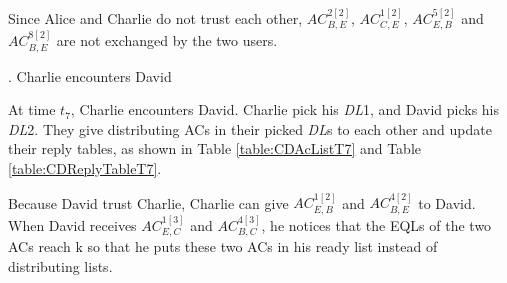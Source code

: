 Since Alice and Charlie do not trust each other, ${AC}^{2\left[2\right]}_{B,E}$, ${AC}^{1\left[2\right]}_{C,E}$, ${AC}^{5\left[2\right]}_{E,B}$ and ${AC}^{8\left[2\right]}_{B,E}$ are not exchanged by the two users.

.  Charlie encounters David

At time ${t}_{7}$, Charlie encounters David. Charlie pick his \textit{DL}1, and David picks his \textit{DL}2. They give distributing ACs in their picked \textit{DL}s to each other and update their reply tables, as shown in Table \ref{table:CDAcListT7} and Table \ref{table:CDReplyTableT7}.

Because David trust Charlie, Charlie can give ${AC}^{1\left[2\right]}_{E,B}$ and ${AC}^{4\left[2\right]}_{B,E}$ to David. When David receives ${AC}^{1\left[3\right]}_{E,C}$ and ${AC}^{4\left[3\right]}_{B,C}$, he notices that the EQLs of the two ACs reach $\mathrm{k}$ so that he puts these two ACs in his ready list instead of distributing lists.

